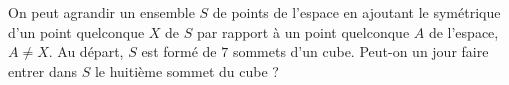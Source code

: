 On peut agrandir un ensemble $S$ de points de l'espace en ajoutant le symétrique d'un point quelconque $X$ de $S$ par rapport à un point quelconque $A$ de l'espace, $A \neq X$. Au départ, $S$ est formé de $7$ sommets d'un cube. Peut-on un jour faire entrer dans $S$ le huitième sommet du cube ?
